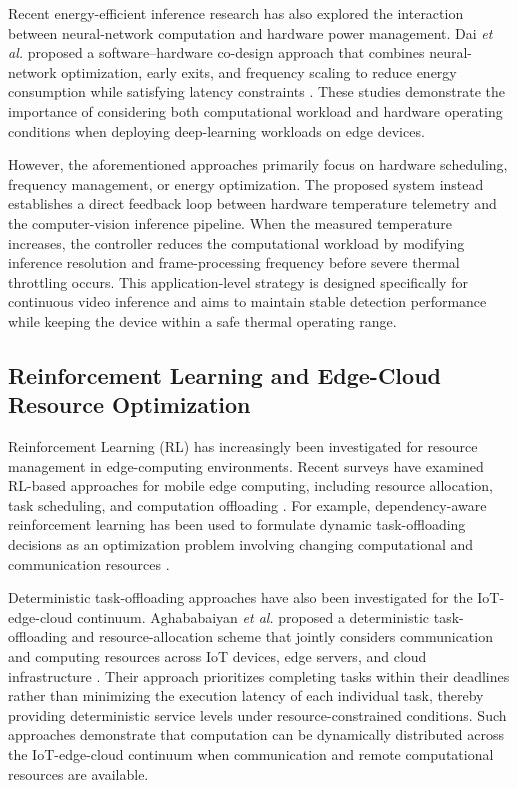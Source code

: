 \documentclass{ieeeaccess}
\begin{document}
Recent energy-efficient inference research has also explored the interaction between neural-network computation and hardware power management. Dai \emph{et al.} proposed a software--hardware co-design approach that combines neural-network optimization, early exits, and frequency scaling to reduce energy consumption while satisfying latency constraints \cite{b8}. These studies demonstrate the importance of considering both computational workload and hardware operating conditions when deploying deep-learning workloads on edge devices.

However, the aforementioned approaches primarily focus on hardware scheduling, frequency management, or energy optimization. The proposed system instead establishes a direct feedback loop between hardware temperature telemetry and the computer-vision inference pipeline. When the measured temperature increases, the controller reduces the computational workload by modifying inference resolution and frame-processing frequency before severe thermal throttling occurs. This application-level strategy is designed specifically for continuous video inference and aims to maintain stable detection performance while keeping the device within a safe thermal operating range.

\subsection{Reinforcement Learning and Edge-Cloud Resource Optimization}

Reinforcement Learning (RL) has increasingly been investigated for resource
management in edge-computing environments. Recent surveys have examined
RL-based approaches for mobile edge computing, including resource allocation,
task scheduling, and computation offloading \cite{b7}. For example,
dependency-aware reinforcement learning has been used to formulate dynamic
task-offloading decisions as an optimization problem involving changing
computational and communication resources \cite{b9}.

Deterministic task-offloading approaches have also been investigated for the
IoT-edge-cloud continuum. Aghababaiyan \emph{et al.} proposed a deterministic
task-offloading and resource-allocation scheme that jointly considers
communication and computing resources across IoT devices, edge servers, and
cloud infrastructure \cite{b25}. Their approach prioritizes completing tasks
within their deadlines rather than minimizing the execution latency of each
individual task, thereby providing deterministic service levels under
resource-constrained conditions. Such approaches demonstrate that
computation can be dynamically distributed across the IoT-edge-cloud
continuum when communication and remote computational resources are available.
\end{document}
